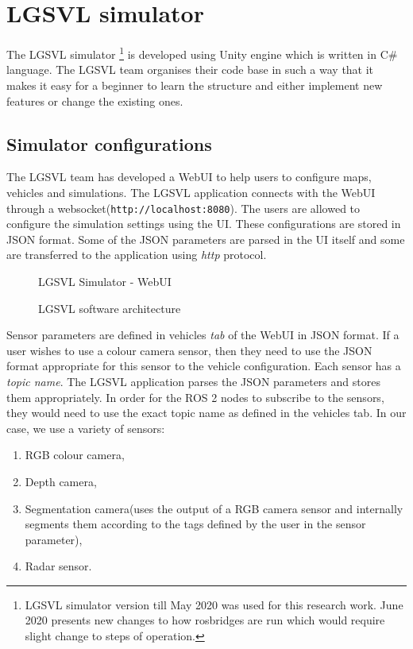 \section{LGSVL simulator}
The LGSVL simulator \footnote{LGSVL simulator version till May 2020 was used for this
    research work. June 2020 presents new changes to how rosbridges are run which would require slight
change to steps of operation.} is developed using Unity engine which is written in C\# language.
The LGSVL team organises their code base\cite{lgsvlgithub} in such a way that it makes it
easy for a beginner to learn the structure and either implement new features or change the
existing ones.

\subsection{Simulator configurations}
The LGSVL team has developed a WebUI to help users to configure maps, vehicles and
simulations. The LGSVL application connects with the WebUI through a
websocket(\texttt{http://localhost:8080}). The users are allowed to configure the
simulation settings using the UI. These configurations are stored in JSON format. Some of the JSON parameters
are parsed in the UI itself and some are transferred to the application using
\textit{http} protocol.

\begin{figure}[!ht]
	\centering
    \def\svgwidth{0.4\textwidth}
    \caption{LGSVL Simulator - WebUI}
    \label{fig:lgsvlwebui}
\end{figure}

\begin{figure}[!ht]
	\centering
    \def\svgwidth{0.6\textwidth}
    \caption{LGSVL software architecture}
    \label{fig:lgsvlswarchitecture}
\end{figure}
Sensor parameters are defined in vehicles \textit{tab} of the WebUI in JSON format. If a user wishes to use a colour camera
sensor, then they need to use the JSON format appropriate for this sensor to the vehicle
configuration. Each sensor has a \textit{topic name}. The LGSVL application parses the JSON
parameters and stores them appropriately. In order for the ROS 2 nodes to subscribe to the
sensors, they would need to use the exact topic name as defined in the vehicles tab.
\newpage
In our case, we use a variety of sensors:
\begin{enumerate}
    \item RGB colour camera,
    \item Depth camera,
    \item Segmentation camera(uses the output of a RGB camera sensor and internally segments them
according to the tags defined by the user in the sensor parameter),
    \item Radar sensor.
\end{enumerate}


